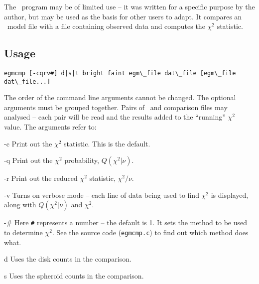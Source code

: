 \documentclass[11pt,twoside]{article}
\begin{document}
The \egmcmp\ program may be of limited use -- it was written for a specific
purpose by the author, but may be used as the basis for other users to adapt.
It compares an \egm\ model file with a file containing observed data and 
computes the $\chi^2$ statistic.

\subsection*{Usage}

\begin{verbatim}
egmcmp [-cqrv#] d|s|t bright faint egm\_file dat\_file [egm\_file dat\_file...]
\end{verbatim}

\nin
The order of the command line arguments cannot be changed. The optional
arguments must be grouped together. Pairs of \egm\ and comparison files may
analysed -- each pair will be read and the results added to the ``running''
$\chi^2$ value. The arguments refer to:
\medskip

\begin{clo}{-c}
Print out the $\chi^2$ statistic. This is the default.
\end{clo}

\begin{clo}{-q}
Print out the $\chi^2$ probability, $Q(\chi^2|\nu)$.
\end{clo}

\begin{clo}{-r}
Print out the reduced $\chi^2$ statistic, $\chi^2/\nu$.
\end{clo}

\begin{clo}{-v}
Turns on verbose mode -- each line of data being used to find $\chi^2$ is
displayed, along with $Q(\chi^2|\nu)$ and $\chi^2$.
\end{clo}

\begin{clo}{-\#}
Here {\tt \#} represents a number -- the default is 1. It sets the method to
be used to determine $\chi^2$. See the source code ({\tt egmcmp.c}) to find
out which method does what.
\end{clo}

\begin{clo}{d}
Uses the disk counts in the comparison.
\end{clo}

\begin{clo}{s}
Uses the spheroid counts in the comparison.
\end{clo}
\end{document}
